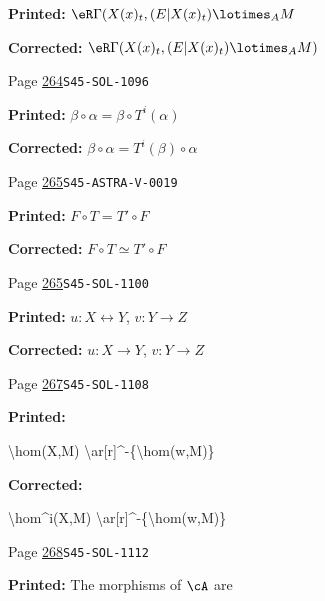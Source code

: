 \begin{description}
\par\noindent\textbf{Printed:} \(\eR\Gamma(X(x)_t,(E|X(x)_t)\lotimes_A M\)
\par\noindent\textbf{Corrected:} \(\eR\Gamma(X(x)_t,(E|X(x)_t)\lotimes_A M)\)
\smallskip
\item[\hypertarget{apparatus:EN-0189}{189}] Page \hyperlink{printpage:en:264}{264}\quad\texttt{S45-SOL-1096}
\par\noindent\textbf{Printed:} \(\beta\circ \alpha = \beta\circ T^i(\alpha)\)
\par\noindent\textbf{Corrected:} \(\beta\circ \alpha = T^i(\beta)\circ\alpha\)
\smallskip
\item[\hypertarget{apparatus:EN-0190}{190}] Page \hyperlink{printpage:en:265}{265}\quad\texttt{S45-ASTRA-V-0019}
\par\noindent\textbf{Printed:} \(F\circ T = T'\circ F\)
\par\noindent\textbf{Corrected:} \(F\circ T \simeq T'\circ F\)
\smallskip
\item[\hypertarget{apparatus:EN-0191}{191}] Page \hyperlink{printpage:en:265}{265}\quad\texttt{S45-SOL-1100}
\par\noindent\textbf{Printed:} $u:X\leftrightarrow Y$, $v:Y\to Z$
\par\noindent\textbf{Corrected:} $u:X\to Y$, $v:Y\to Z$
\smallskip
\item[\hypertarget{apparatus:EN-0192}{192}] Page \hyperlink{printpage:en:267}{267}\quad\texttt{S45-SOL-1108}
\par\noindent\textbf{Printed:} {\footnotesize\ttfamily\raggedright \textbackslash{}\allowbreak{}hom(\allowbreak{}X,\allowbreak{}M)\allowbreak{} \textbackslash{}\allowbreak{}ar[\allowbreak{}r]\allowbreak{}\textasciicircum{}\allowbreak{}-\allowbreak{}\{\allowbreak{}\textbackslash{}\allowbreak{}hom(\allowbreak{}w,\allowbreak{}M)\allowbreak{}\}\allowbreak{}\par}
\par\noindent\textbf{Corrected:} {\footnotesize\ttfamily\raggedright \textbackslash{}\allowbreak{}hom\textasciicircum{}\allowbreak{}i(\allowbreak{}X,\allowbreak{}M)\allowbreak{} \textbackslash{}\allowbreak{}ar[\allowbreak{}r]\allowbreak{}\textasciicircum{}\allowbreak{}-\allowbreak{}\{\allowbreak{}\textbackslash{}\allowbreak{}hom(\allowbreak{}w,\allowbreak{}M)\allowbreak{}\}\allowbreak{}\par}
\smallskip
\item[\hypertarget{apparatus:EN-0193}{193}] Page \hyperlink{printpage:en:268}{268}\quad\texttt{S45-SOL-1112}
\par\noindent\textbf{Printed:} The morphisms of $\cA$ are

\end{description}
